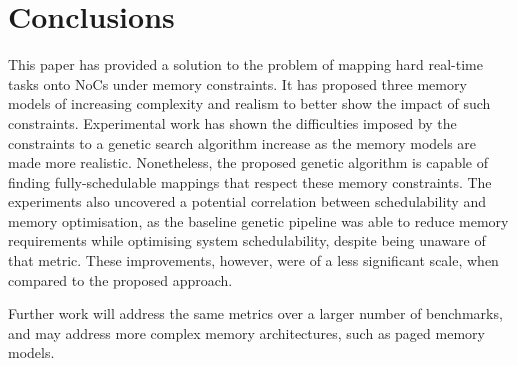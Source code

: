 \documentclass[conference]{IEEEtran}
\begin{document}
\section{Conclusions}\label{conclusions}

This paper has provided a solution to the problem of mapping hard real-time tasks onto NoCs under memory constraints. It has proposed three memory models of increasing complexity and realism to better show the impact of such constraints. Experimental work has shown the difficulties imposed by the constraints to a genetic search algorithm increase as the memory models are made more realistic. Nonetheless, the proposed genetic algorithm is capable of finding fully-schedulable mappings that respect these memory constraints. The experiments also uncovered a potential correlation between schedulability and memory optimisation, as the baseline genetic pipeline was able to reduce memory requirements while optimising system schedulability, despite being unaware of that metric. These improvements, however, were of a less significant scale, when compared to the proposed approach.

Further work will address the same metrics over a larger number of benchmarks, and may address more complex memory architectures, such as paged memory models.
  


\end{document}

